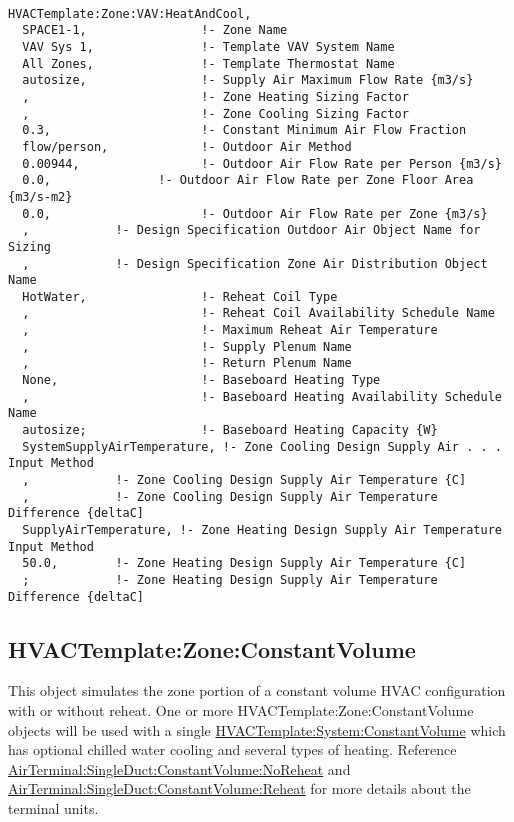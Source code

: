 \begin{lstlisting}

HVACTemplate:Zone:VAV:HeatAndCool,
  SPACE1-1,                !- Zone Name
  VAV Sys 1,               !- Template VAV System Name
  All Zones,               !- Template Thermostat Name
  autosize,                !- Supply Air Maximum Flow Rate {m3/s}
  ,                        !- Zone Heating Sizing Factor
  ,                        !- Zone Cooling Sizing Factor
  0.3,                     !- Constant Minimum Air Flow Fraction
  flow/person,             !- Outdoor Air Method
  0.00944,                 !- Outdoor Air Flow Rate per Person {m3/s}
  0.0,               !- Outdoor Air Flow Rate per Zone Floor Area {m3/s-m2}
  0.0,                     !- Outdoor Air Flow Rate per Zone {m3/s}
  ,            !- Design Specification Outdoor Air Object Name for Sizing
  ,            !- Design Specification Zone Air Distribution Object Name
  HotWater,                !- Reheat Coil Type
  ,                        !- Reheat Coil Availability Schedule Name
  ,                        !- Maximum Reheat Air Temperature
  ,                        !- Supply Plenum Name
  ,                        !- Return Plenum Name
  None,                    !- Baseboard Heating Type
  ,                        !- Baseboard Heating Availability Schedule Name
  autosize;                !- Baseboard Heating Capacity {W}
  SystemSupplyAirTemperature, !- Zone Cooling Design Supply Air . . . Input Method
  ,            !- Zone Cooling Design Supply Air Temperature {C]
  ,            !- Zone Cooling Design Supply Air Temperature Difference {deltaC]
  SupplyAirTemperature, !- Zone Heating Design Supply Air Temperature Input Method
  50.0,        !- Zone Heating Design Supply Air Temperature {C]
  ;            !- Zone Heating Design Supply Air Temperature Difference {deltaC]
\end{lstlisting}

\subsection{HVACTemplate:Zone:ConstantVolume}\label{hvactemplatezoneconstantvolume}

This object simulates the zone portion of a constant volume HVAC configuration with or without reheat. One or more HVACTemplate:Zone:ConstantVolume objects will be used with a single \hyperref[hvactemplatesystemconstantvolume]{HVACTemplate:System:ConstantVolume} which has optional chilled water cooling and several types of heating. Reference \hyperref[airterminalsingleductconstantvolumenoreheat]{AirTerminal:SingleDuct:ConstantVolume:NoReheat} and \hyperref[airterminalsingleductconstantvolumereheat]{AirTerminal:SingleDuct:ConstantVolume:Reheat} for more details about the terminal units.

